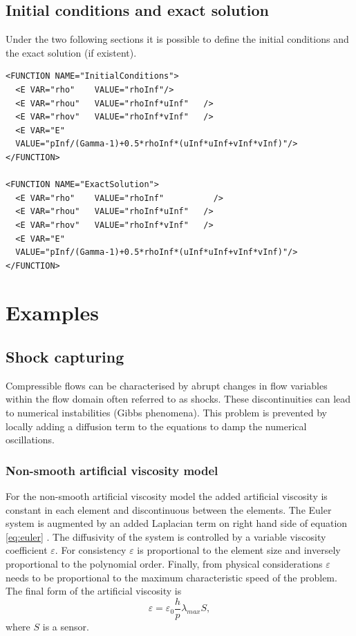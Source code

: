 \subsection*{Initial conditions and exact solution}
Under the two following sections it is possible to define the initial 
conditions and the exact solution (if existent).
\begin{lstlisting}[style=XmlStyle]
<FUNCTION NAME="InitialConditions">
  <E VAR="rho"    VALUE="rhoInf"/>
  <E VAR="rhou"   VALUE="rhoInf*uInf"   />
  <E VAR="rhov"   VALUE="rhoInf*vInf"   />
  <E VAR="E"
  VALUE="pInf/(Gamma-1)+0.5*rhoInf*(uInf*uInf+vInf*vInf)"/>
</FUNCTION>

<FUNCTION NAME="ExactSolution">
  <E VAR="rho"    VALUE="rhoInf"          />
  <E VAR="rhou"   VALUE="rhoInf*uInf"   />
  <E VAR="rhov"   VALUE="rhoInf*vInf"   />
  <E VAR="E"
  VALUE="pInf/(Gamma-1)+0.5*rhoInf*(uInf*uInf+vInf*vInf)"/>
</FUNCTION>
\end{lstlisting}

\section{Examples}
\subsection{Shock capturing}
Compressible flows can be characterised by abrupt changes in flow variables within the 
flow domain often referred to as shocks. These discontinuities can lead to 
numerical instabilities (Gibbs phenomena). This problem is prevented by locally 
adding a diffusion term to the equations to damp the numerical oscillations.

\subsubsection{Non-smooth artificial viscosity model}\label{subsec:non-smooth-AV}
For the non-smooth artificial viscosity model the added artificial viscosity is 
constant in each element and discontinuous between the elements. The Euler 
system is augmented by an added Laplacian term on right hand side of 
equation \ref{eq:euler} \cite{persson2006sub}.
The diffusivity of the system is controlled by a variable viscosity coefficient $\varepsilon$.
For consistency $\varepsilon$ is proportional to the element size and inversely proportional to the polynomial order.
Finally, from physical considerations $\varepsilon$ needs to be proportional to the maximum characteristic speed of the problem.
The final form of the artificial viscosity is
\begin{equation}
  \varepsilon = \varepsilon_0 \frac{h}{p} \lambda_{max} S,
\end{equation}
where $S$ is a sensor.

